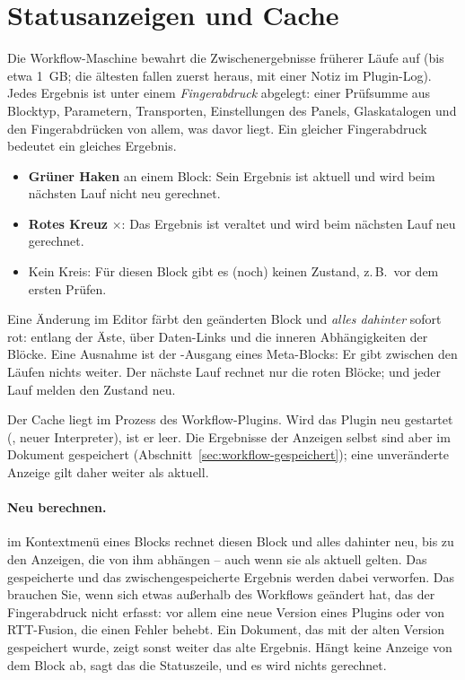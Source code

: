 \section{Statusanzeigen und Cache}\label{sec:workflow-status}

Die Workflow-Maschine bewahrt die Zwischenergebnisse früherer Läufe auf (bis etwa 1~GB; die
ältesten fallen zuerst heraus, mit einer Notiz im Plugin-Log). Jedes Ergebnis ist unter einem
\emph{Fingerabdruck} abgelegt: einer Prüfsumme aus Blocktyp, Parametern, Transporten,
Einstellungen des Panels, Glaskatalogen und den Fingerabdrücken von allem, was davor liegt. Ein
gleicher Fingerabdruck bedeutet ein gleiches Ergebnis.

\begin{itemize}
  \item \textbf{Grüner Haken} \checkmark{} an einem Block: Sein Ergebnis ist aktuell und wird
        beim nächsten Lauf nicht neu gerechnet.
  \item \textbf{Rotes Kreuz} $\times$: Das Ergebnis ist veraltet und wird beim nächsten Lauf
        neu gerechnet.
  \item Kein Kreis: Für diesen Block gibt es (noch) keinen Zustand, z.\,B.\ vor dem ersten
        Prüfen.
\end{itemize}

Eine Änderung im Editor färbt den geänderten Block und \emph{alles dahinter} sofort rot: entlang
der Äste, über Daten-Links und die inneren Abhängigkeiten der Blöcke. Eine Ausnahme ist der
-Ausgang eines Meta-Blocks: Er gibt zwischen den Läufen nichts weiter. Der nächste
Lauf rechnet nur die roten Blöcke;  und jeder Lauf melden den Zustand neu.

\begin{hinweis}
Der Cache liegt im Prozess des Workflow-Plugins. Wird das Plugin neu gestartet
(, neuer Interpreter), ist er leer. Die Ergebnisse der Anzeigen
selbst sind aber im Dokument gespeichert (Abschnitt~\ref{sec:workflow-gespeichert}); eine
unveränderte Anzeige gilt daher weiter als aktuell.
\end{hinweis}

\paragraph{Neu berechnen.}  im Kontextmenü eines Blocks rechnet diesen Block und
alles dahinter neu, bis zu den Anzeigen, die von ihm abhängen – auch wenn sie als aktuell gelten.
Das gespeicherte und das zwischengespeicherte Ergebnis werden dabei verworfen. Das brauchen Sie,
wenn sich etwas außerhalb des Workflows geändert hat, das der Fingerabdruck nicht erfasst: vor
allem eine neue Version eines Plugins oder von RTT-Fusion, die einen Fehler behebt. Ein Dokument,
das mit der alten Version gespeichert wurde, zeigt sonst weiter das alte Ergebnis. Hängt keine
Anzeige von dem Block ab, sagt das die Statuszeile, und es wird nichts gerechnet.

